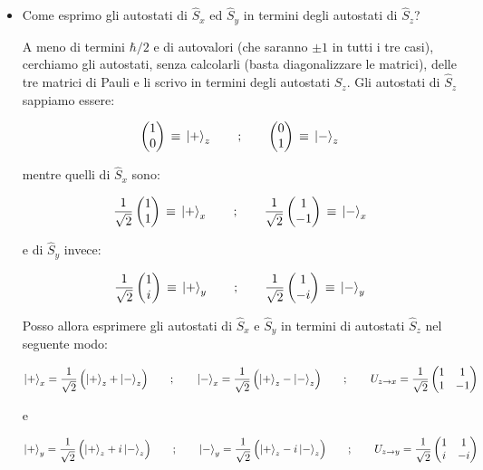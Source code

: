 \begin{itemize}
	\item Come esprimo gli autostati di $\hat{S}_x$ ed $\hat{S}_y$ in termini degli autostati di $\hat{S}_z$? 
	
		A meno di termini $\hbar/2$ e di autovalori (che saranno $\pm 1$ in tutti i tre casi), cerchiamo gli autostati, senza calcolarli (basta diagonalizzare le matrici), delle tre matrici di Pauli e li scrivo in termini degli autostati $\hat{S}_z$. Gli autostati di $\hat{S}_z$ sappiamo essere:
	
	\begin{align*}
		\mqty( 1 \\ 0) \, \equiv \, \ket{+}_z \qquad ; \qquad  \mqty( 0 \\  1) \, \equiv \, \ket{-}_z
	\end{align*}
	
		mentre quelli di $\hat{S}_x$ sono:
		
	\begin{align*}
		\frac{1}{\sqrt{2}} \, \mqty( 1 \\ 1) \, \equiv \, \ket{+}_x \qquad ; \qquad  \frac{1}{\sqrt{2}} \,\mqty( 1 \\  -1) \, \equiv \, \ket{-}_x
	\end{align*}
	
		e di $\hat{S}_y$ invece:
		
	\begin{align*}
		\frac{1}{\sqrt{2}} \, \mqty( 1 \\ i) \, \equiv \, \ket{+}_y \qquad ; \qquad  \frac{1}{\sqrt{2}} \,\mqty( 1 \\  -i) \, \equiv \, \ket{-}_y
	\end{align*}
	
		Posso allora esprimere gli autostati di $\hat{S}_x$ e $\hat{S}_y$ in termini di autostati $\hat{S}_z$ nel seguente modo:
		
	\begin{align*}
		\ket{+}_x = \frac{1}{\sqrt{2}} \, \qty\Big(\ket{+}_z + \ket{-}_z) \qquad ; \qquad \ket{-}_x = \frac{1}{\sqrt{2}} \, \qty\Big(\ket{+}_z - \ket{-}_z) \qquad ; \qquad U_{z \to x} = \frac{1}{\sqrt{2}} \, \mqty( 1 & 1 \\ 1 & -1)
	\end{align*}
	
		e
	
	\begin{align*}
		\ket{+}_y = \frac{1}{\sqrt{2}} \, \qty\Big(\ket{+}_z + i \ket{-}_z) \qquad ; \qquad \ket{-}_y = \frac{1}{\sqrt{2}} \, \qty\Big(\ket{+}_z - i \ket{-}_z) \qquad ; \qquad U_{z \to y} = \frac{1}{\sqrt{2}} \, \mqty( 1 & 1 \\ i & -i)
	\end{align*}

\end{itemize}

